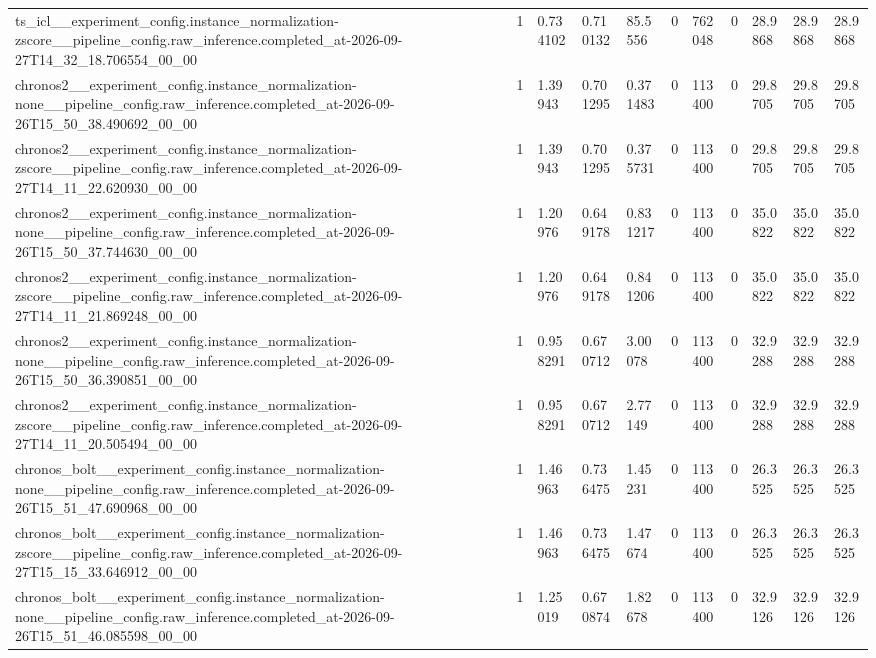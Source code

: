 \begin{tabular}{lllllllllll}
ts\_icl\_\_experiment\_config.instance\_normalization-zscore\_\_pipeline\_config.raw\_inference.completed\_at-2026-09-27T14\_32\_18.706554\_00\_00 & 1 & 0.734102 & 0.710132 & 85.5556 & 0 & 762048 & 0 & 28.9868 & 28.9868 & 28.9868 \\
chronos2\_\_experiment\_config.instance\_normalization-none\_\_pipeline\_config.raw\_inference.completed\_at-2026-09-26T15\_50\_38.490692\_00\_00 & 1 & 1.39943 & 0.701295 & 0.371483 & 0 & 113400 & 0 & 29.8705 & 29.8705 & 29.8705 \\
chronos2\_\_experiment\_config.instance\_normalization-zscore\_\_pipeline\_config.raw\_inference.completed\_at-2026-09-27T14\_11\_22.620930\_00\_00 & 1 & 1.39943 & 0.701295 & 0.375731 & 0 & 113400 & 0 & 29.8705 & 29.8705 & 29.8705 \\
chronos2\_\_experiment\_config.instance\_normalization-none\_\_pipeline\_config.raw\_inference.completed\_at-2026-09-26T15\_50\_37.744630\_00\_00 & 1 & 1.20976 & 0.649178 & 0.831217 & 0 & 113400 & 0 & 35.0822 & 35.0822 & 35.0822 \\
chronos2\_\_experiment\_config.instance\_normalization-zscore\_\_pipeline\_config.raw\_inference.completed\_at-2026-09-27T14\_11\_21.869248\_00\_00 & 1 & 1.20976 & 0.649178 & 0.841206 & 0 & 113400 & 0 & 35.0822 & 35.0822 & 35.0822 \\
chronos2\_\_experiment\_config.instance\_normalization-none\_\_pipeline\_config.raw\_inference.completed\_at-2026-09-26T15\_50\_36.390851\_00\_00 & 1 & 0.958291 & 0.670712 & 3.00078 & 0 & 113400 & 0 & 32.9288 & 32.9288 & 32.9288 \\
chronos2\_\_experiment\_config.instance\_normalization-zscore\_\_pipeline\_config.raw\_inference.completed\_at-2026-09-27T14\_11\_20.505494\_00\_00 & 1 & 0.958291 & 0.670712 & 2.77149 & 0 & 113400 & 0 & 32.9288 & 32.9288 & 32.9288 \\
chronos\_bolt\_\_experiment\_config.instance\_normalization-none\_\_pipeline\_config.raw\_inference.completed\_at-2026-09-26T15\_51\_47.690968\_00\_00 & 1 & 1.46963 & 0.736475 & 1.45231 & 0 & 113400 & 0 & 26.3525 & 26.3525 & 26.3525 \\
chronos\_bolt\_\_experiment\_config.instance\_normalization-zscore\_\_pipeline\_config.raw\_inference.completed\_at-2026-09-27T15\_15\_33.646912\_00\_00 & 1 & 1.46963 & 0.736475 & 1.47674 & 0 & 113400 & 0 & 26.3525 & 26.3525 & 26.3525 \\
chronos\_bolt\_\_experiment\_config.instance\_normalization-none\_\_pipeline\_config.raw\_inference.completed\_at-2026-09-26T15\_51\_46.085598\_00\_00 & 1 & 1.25019 & 0.670874 & 1.82678 & 0 & 113400 & 0 & 32.9126 & 32.9126 & 32.9126 \\

\end{tabular}
